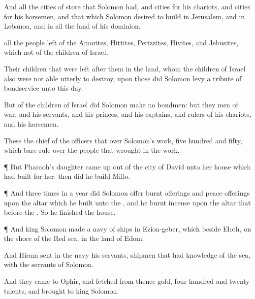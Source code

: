 {And all the
cities of
store that
Solomon had, and
cities for his
chariots, and
cities for his
horsemen, and
that which
Solomon
desired to
build in
Jerusalem, and in
Lebanon, and in all the
land of his
dominion.

 all the
people
{}
left of the
Amorites,
Hittites,
Perizzites,
Hivites, and
Jebusites, which
{} not of the
children of
Israel,

Their
children that were
left
after them in the
land, whom the
children of
Israel also were not
able utterly to
destroy, upon those did
Solomon
levy a
tribute of
bondservice unto this
day.

But of the
children of
Israel did
Solomon
make no
bondmen: but they
{}
men of
war, and his
servants, and his
princes, and his
captains, and
rulers of his
chariots, and his
horsemen.

These
{} the
chief of the
officers that
{} over
Solomon’s
work,
five
hundred and
fifty, which bare
rule over the
people that
wrought in the
work.


\par }{\PP {}¶ But
Pharaoh’s
daughter came
up out of the
city of
David unto her
house which
{} had
built for her: then did he
build
Millo.


\par }{\PP {}¶ And
three
times in a
year did
Solomon
offer burnt
offerings and peace
offerings upon the
altar which he
built unto the
{}, and he burnt
incense upon the
altar that
{}
before the
{}. So he
finished the
house.


\par }{\PP {}¶ And
king
Solomon
made a navy of
ships in
Ezion-geber, which
{} beside
Eloth, on the
shore of the
Red
sea, in the
land of
Edom.

And
Hiram
sent in the
navy his
servants,
shipmen that had
knowledge of the
sea, with the
servants of
Solomon.

And they
came to
Ophir, and
fetched from thence
gold,
four
hundred and
twenty
talents, and
brought
{} to
king
Solomon.




\par }

